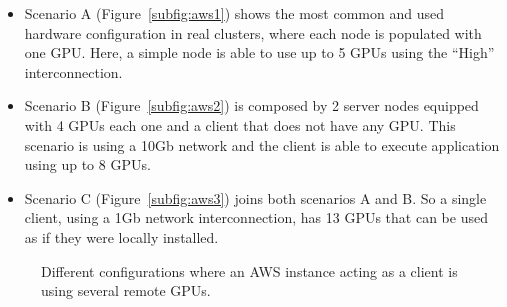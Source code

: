 \documentclass[a4paper,twoside]{article}
\begin{document}
\begin{itemize}
\item Scenario A (Figure~\ref{subfig:aws1}) shows the most common 
and used hardware configuration in real clusters, where each node is 
populated with one GPU. Here, a simple node is able to use up to 5 GPUs 
using the ``High'' interconnection. 

\item Scenario B (Figure~\ref{subfig:aws2}) is composed by 2 server nodes equipped 
with 4 GPUs each one and a client that does not have any GPU. This scenario is using 
a 10Gb network and the client is able to execute application using up to 8 GPUs.

\item Scenario C (Figure~\ref{subfig:aws3}) joins both scenarios A and B. So a 
single client, using a 1Gb network interconnection, has 13 GPUs that can be used as if they were locally installed.
\end{itemize}

\begin{figure}[ht]
\centering
{}
\quad
{}
\caption{Different configurations where an AWS instance acting as a client is using several remote GPUs.}
\label{fig:aws}
\end{figure}
\end{document}
